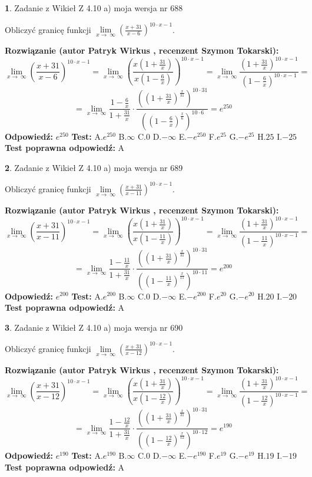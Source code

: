 \documentclass[12pt, a4paper]{article}
\theoremstyle{definition} %
\newtheorem{zad}{}
\newcommand{\zadStart}[1]{\begin{zad}#1\newline}
\newcommand{\zadStop}{\end{zad}}
\newcommand{\rozwStart}[2]{\noindent \textbf{Rozwiązanie (autor #1 , recenzent #2): }\newline}
\newcommand{\rozwStop}{\newline}
\newcommand{\odpStart}{\noindent \textbf{Odpowiedź:}\newline}
\newcommand{\odpStop}{\newline}
\newcommand{\testStart}{\noindent \textbf{Test:}\newline}
\newcommand{\testStop}{\newline}
\newcommand{\kluczStart}{\noindent \textbf{Test poprawna odpowiedź:}\newline}
\newcommand{\kluczStop}{\newline}
\begin{document}
\zadStart{Zadanie z Wikieł Z 4.10 a) moja wersja nr 688}

Obliczyć granicę funkcji  $\lim\limits_{x\to\ \infty}(\frac{x+31}{x-6})^{10\cdot x-1}$.
\zadStop
\rozwStart{Patryk Wirkus}{Szymon Tokarski}
$$\lim\limits_{x\to\ \infty}(\frac{x+31}{x-6})^{10\cdot x-1} = \lim\limits_{x\to\ \infty}(\frac{x(1+\frac{31}{x})}{x(1-\frac{6}{x})})^{10\cdot x-1}=\lim\limits_{x\to\ \infty}\frac{(1+\frac{31}{x})^{10\cdot x-1}}{(1-\frac{6}{x})^{10\cdot x-1}}=$$
$$=\lim\limits_{x\to\ \infty}\frac{1-\frac{6}{x}}{1+\frac{31}{x}}\cdot\frac{((1+\frac{31}{x})^{\frac{x}{31}})^{10\cdot31}}{((1-\frac{6}{x})^{\frac{x}{6}})^{10\cdot6}}=e^{250}$$
\rozwStop
\odpStart
$e^{250}$
\odpStop
\testStart
A.$e^{250}$ B.$\infty$ C.$0$ D.$-\infty$ E.$-e^{250}$
F.$e^{25}$ G.$-e^{25}$
H.$25$
I.$-25$
\testStop
\kluczStart
A
\kluczStop



\zadStart{Zadanie z Wikieł Z 4.10 a) moja wersja nr 689}

Obliczyć granicę funkcji  $\lim\limits_{x\to\ \infty}(\frac{x+31}{x-11})^{10\cdot x-1}$.
\zadStop
\rozwStart{Patryk Wirkus}{Szymon Tokarski}
$$\lim\limits_{x\to\ \infty}(\frac{x+31}{x-11})^{10\cdot x-1} = \lim\limits_{x\to\ \infty}(\frac{x(1+\frac{31}{x})}{x(1-\frac{11}{x})})^{10\cdot x-1}=\lim\limits_{x\to\ \infty}\frac{(1+\frac{31}{x})^{10\cdot x-1}}{(1-\frac{11}{x})^{10\cdot x-1}}=$$
$$=\lim\limits_{x\to\ \infty}\frac{1-\frac{11}{x}}{1+\frac{31}{x}}\cdot\frac{((1+\frac{31}{x})^{\frac{x}{31}})^{10\cdot31}}{((1-\frac{11}{x})^{\frac{x}{11}})^{10\cdot11}}=e^{200}$$
\rozwStop
\odpStart
$e^{200}$
\odpStop
\testStart
A.$e^{200}$ B.$\infty$ C.$0$ D.$-\infty$ E.$-e^{200}$
F.$e^{20}$ G.$-e^{20}$
H.$20$
I.$-20$
\testStop
\kluczStart
A
\kluczStop



\zadStart{Zadanie z Wikieł Z 4.10 a) moja wersja nr 690}

Obliczyć granicę funkcji  $\lim\limits_{x\to\ \infty}(\frac{x+31}{x-12})^{10\cdot x-1}$.
\zadStop
\rozwStart{Patryk Wirkus}{Szymon Tokarski}
$$\lim\limits_{x\to\ \infty}(\frac{x+31}{x-12})^{10\cdot x-1} = \lim\limits_{x\to\ \infty}(\frac{x(1+\frac{31}{x})}{x(1-\frac{12}{x})})^{10\cdot x-1}=\lim\limits_{x\to\ \infty}\frac{(1+\frac{31}{x})^{10\cdot x-1}}{(1-\frac{12}{x})^{10\cdot x-1}}=$$
$$=\lim\limits_{x\to\ \infty}\frac{1-\frac{12}{x}}{1+\frac{31}{x}}\cdot\frac{((1+\frac{31}{x})^{\frac{x}{31}})^{10\cdot31}}{((1-\frac{12}{x})^{\frac{x}{12}})^{10\cdot12}}=e^{190}$$
\rozwStop
\odpStart
$e^{190}$
\odpStop
\testStart
A.$e^{190}$ B.$\infty$ C.$0$ D.$-\infty$ E.$-e^{190}$
F.$e^{19}$ G.$-e^{19}$
H.$19$
I.$-19$
\testStop
\kluczStart
A
\kluczStop
\end{document}
